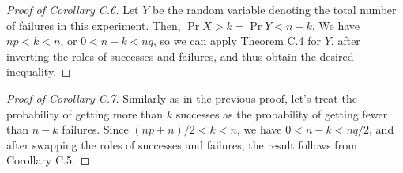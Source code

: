 \begin{proof}[Proof of Corollary C.6]
    Let $Y$ be the random variable denoting the total number of failures in this experiment.
    Then, $\Pr{X>k}=\Pr{Y<n-k}$.
    We have $np<k<n$, or $0<n-k<nq$, so we can apply Theorem C.4 for $Y$, after inverting the roles of successes and failures, and thus obtain the desired inequality.
\end{proof}

\begin{proof}[Proof of Corollary C.7]
    Similarly as in the previous proof, let's treat the probability of getting more than $k$ successes as the probability of getting fewer than $n-k$ failures.
    Since $(np+n)/2<k<n$, we have $0<n-k<nq/2$, and after swapping the roles of successes and failures, the result follows from Corollary C.5.
\end{proof}

